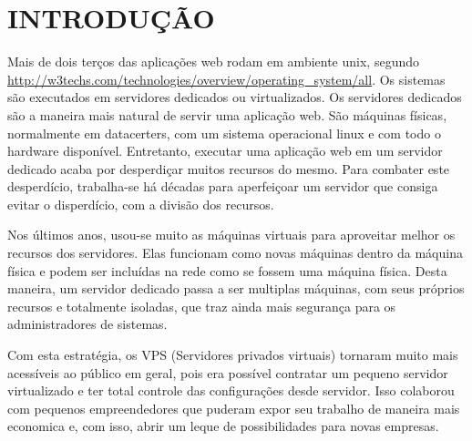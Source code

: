 \documentclass[
	12pt,				%
	openright,			%
	oneside,			%
	a4paper,			%
	chapter=TITLE,		%
	section=TITLE,		%
	english,			%
	french,				%
	spanish,			%
	brazil				%
	]{abntex2}
\begin{document}
\tableofcontents*
\clearpage

\textual



\chapter{INTRODUÇÃO}

Mais de dois terços das aplicações web rodam em ambiente unix, segundo
\url{http://w3techs.com/technologies/overview/operating\_system/all}. Os sistemas são executados em servidores dedicados ou virtualizados. Os servidores dedicados são a maneira mais natural de servir uma aplicação web. São máquinas físicas, normalmente em datacerters, com um sistema operacional linux e com todo o hardware disponível.
Entretanto, executar uma aplicação web em um servidor dedicado acaba por desperdiçar muitos recursos do mesmo. Para combater este desperdício, trabalha-se há décadas para aperfeiçoar um servidor que consiga evitar o disperdício, com a divisão dos recursos.

Nos últimos anos, usou-se muito as máquinas virtuais para aproveitar melhor os recursos dos servidores. Elas funcionam como novas máquinas dentro da máquina física e podem ser incluídas na rede como se fossem uma máquina física. Desta maneira, um servidor dedicado passa a ser multiplas máquinas, com seus próprios recursos e totalmente isoladas, que traz ainda mais segurança para os administradores de sistemas.

Com esta estratégia, os VPS (Servidores privados virtuais) tornaram muito mais acessíveis ao público em geral, pois era possível contratar um pequeno servidor virtualizado e ter total controle das configurações desde servidor. Isso colaborou com pequenos empreendedores que puderam expor seu trabalho de maneira mais economica e, com isso, abrir um leque de possibilidades para novas empresas.
\end{document}

